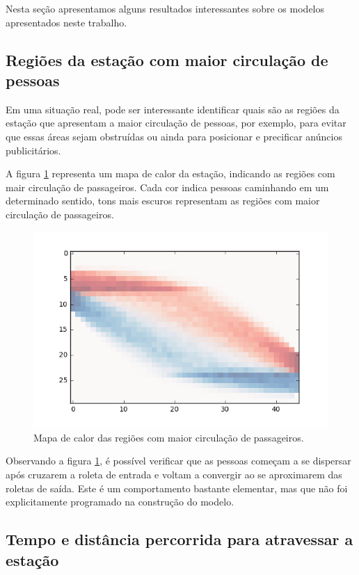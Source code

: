 \documentclass[preprint,12pt]{elsarticle}
\begin{document}
Nesta seção apresentamos alguns resultados interessantes sobre os modelos apresentados neste trabalho.

\subsection{Regiões da estação com maior circulação de pessoas}
\label{subsec:metro_heatmap}

Em uma situação real, pode ser interessante identificar quais são as regiões da estação que apresentam a maior circulação de pessoas, por exemplo, para evitar que essas áreas sejam obstruídas ou ainda para posicionar e precificar anúncios publicitários.

A figura \ref{fig:heatmap} representa um mapa de calor da estação, indicando as regiões com mair circulação de passageiros. Cada cor indica pessoas caminhando em um determinado sentido, tons mais escuros representam as regiões com maior circulação de passageiros.

\begin{figure}[H]
	\centering
	\includegraphics[totalheight=7cm]{figures/heatmap.png}
	\caption{Mapa de calor das regiões com maior circulação de passageiros.}
	\label{fig:heatmap}
\end{figure}

Observando a figura \ref{fig:heatmap}, é possível verificar que as pessoas começam a se dispersar após cruzarem a roleta de entrada e voltam a convergir ao se aproximarem das roletas de saída. Este é um comportamento bastante elementar, mas que não foi explicitamente programado na construção do modelo.

\subsection{Tempo e distância percorrida para atravessar a estação}
\label{subsec:tempo_travessia}
\end{document}
